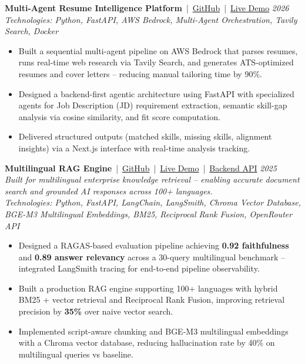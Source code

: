 \documentclass[11pt,a4paper]{article}
\begin{document}
\textbf{Multi-Agent Resume Intelligence Platform} \,|\,
\href{https://github.com/raza-shaikh-ai/Ai-agent-resume}{GitHub} \,|\,
\href{https://ai-agent-resume-three.vercel.app/}{Live Demo}
\hfill \textit{2026} \\
\textit{Technologies: Python, FastAPI, AWS Bedrock, Multi-Agent Orchestration, Tavily Search, Docker}
\begin{itemize}
    \item Built a sequential multi-agent pipeline on AWS Bedrock that parses resumes, runs real-time web research via Tavily Search, and generates ATS-optimized resumes and cover letters -- reducing manual tailoring time by 90\%.
    \item Designed a backend-first agentic architecture using FastAPI with specialized agents for Job Description (JD) requirement extraction, semantic skill-gap analysis via cosine similarity, and fit score computation.
    \item Delivered structured outputs (matched skills, missing skills, alignment insights) via a Next.js interface with real-time analysis tracking.
\end{itemize}
\vspace{1pt}

\textbf{Multilingual RAG Engine} \,|\,
\href{https://github.com/raza-shaikh-ai/Rag-systems}{GitHub} \,|\,
\href{https://rag-systems.vercel.app}{Live Demo} \,|\,
\href{https://razashaikh9921-main-dev.hf.space/docs}{Backend API}
\hfill \textit{2025} \\
\textit{Built for multilingual enterprise knowledge retrieval -- enabling accurate document search and grounded AI responses across 100+ languages.} \\
\textit{Technologies: Python, FastAPI, LangChain, LangSmith, Chroma Vector Database, BGE-M3 Multilingual Embeddings, BM25, Reciprocal Rank Fusion, OpenRouter API}
\begin{itemize}
    \item Designed a RAGAS-based evaluation pipeline achieving \textbf{0.92 faithfulness} and \textbf{0.89 answer relevancy} across a 30-query multilingual benchmark -- integrated LangSmith tracing for end-to-end pipeline observability.
    \item Built a production RAG engine supporting 100+ languages with hybrid BM25 + vector retrieval and Reciprocal Rank Fusion, improving retrieval precision by \textbf{35\%} over naive vector search.
    \item Implemented script-aware chunking and BGE-M3 multilingual embeddings with a Chroma vector database, reducing hallucination rate by 40\% on multilingual queries vs baseline.
\end{itemize}
\vspace{2pt}
\end{document}
